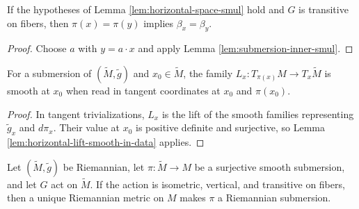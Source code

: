 \begin{lemma}
\label{lem:submersion-inner-congr}





If the hypotheses of Lemma \ref{lem:horizontal-space-smul} hold and $G$ is transitive on fibers, then $\pi(x)=\pi(y)$ implies $\beta_x=\beta_y$.
\end{lemma}

\begin{proof}

\sketch Choose $a$ with $y=a\cdot x$ and apply Lemma \ref{lem:submersion-inner-smul}.
\end{proof}

\begin{lemma}
\label{lem:horizontal-lift-in-coordinates-smooth}





For a submersion of $(\tilde M,\tilde g)$ and $x_0\in\tilde M$, the family $L_x:T_{\pi(x)}M\to T_x\tilde M$ is smooth at $x_0$ when read in tangent coordinates at $x_0$ and $\pi(x_0)$.
\end{lemma}

\begin{proof}

\sketch In tangent trivializations, $L_x$ is the lift of the smooth families representing $\tilde g_x$ and $d\pi_x$. Their value at $x_0$ is positive definite and surjective, so Lemma \ref{lem:horizontal-lift-smooth-in-data} applies.
\end{proof}

\begin{theorem}
\label{thm:group-action-riemannian-submersion}





Let $(\tilde M,\tilde g)$ be Riemannian, let $\pi:\tilde M\to M$ be a surjective smooth submersion, and let $G$ act on $\tilde M$. If the action is isometric, vertical, and transitive on fibers, then a unique Riemannian metric on $M$ makes $\pi$ a Riemannian submersion.
\end{theorem}

